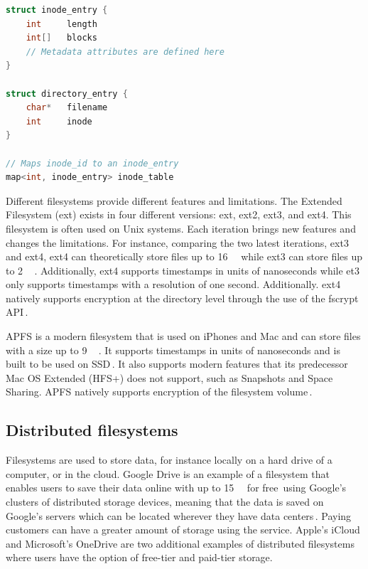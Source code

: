 \begin{minipage}{\linewidth}
\begin{lstlisting}[language=c, caption={Pseudocode of a minimalistic inode filesystem structure}, label=lst:inode_fs]
struct inode_entry {
	int 	length
	int[]	blocks
	// Metadata attributes are defined here
}

struct directory_entry {
	char*   filename
	int     inode
}

// Maps inode_id to an inode_entry
map<int, inode_entry> inode_table

\end{lstlisting}
\end{minipage}

Different filesystems provide different features and limitations. The Extended Filesystem (ext) exists in four different versions: ext, ext2, ext3, and ext4. This filesystem is often used on Unix systems. Each iteration brings new features and changes the limitations. For instance, comparing the two latest iterations, ext3 and ext4, ext4 can theoretically store files up to \SI{16}{\tebi\byte} while ext3 can store files up to \SI{2}{\tebi\byte}\,\cite{salterUnderstandingLinuxFilesystems2018}. Additionally, ext4 supports timestamps in units of nanoseconds while et3 only supports timestamps with a resolution of one second. Additionally. ext4 natively supports encryption at the directory level through the use of the fscrypt \gls{API}\,\cite{FscryptArchWiki}.

\gls{APFS} is a modern filesystem that is used on iPhones and Mac and can store files with a size up to \SI{9}{\exa\byte}\,\cite{igotofferAPFSAppleFile2017}. It supports timestamps in units of nanoseconds and is built to be used on \gls{SSD}\,\cite{nelsonWhatAPFSDoes}. It also supports modern features that its predecessor Mac OS Extended (HFS+) does not support, such as Snapshots and Space Sharing. \gls{APFS} natively supports encryption of the filesystem volume\,\cite{appleinc.FileSystemFormats}.

\subsection{Distributed filesystems}
Filesystems are used to store data, for instance locally on a hard drive of a computer, or in the cloud. Google Drive is an example of a filesystem that enables users to save their data online with up to \SI{15}{\giga\byte} for free\,\cite{CloudStorageWork} using Google's clusters of distributed storage devices, meaning that the data is saved on Google's servers which can be located wherever they have data centers\,\cite{DistributedStorageWhat}. Paying customers can have a greater amount of storage using the service. Apple's iCloud and Microsoft's OneDrive are two additional examples of distributed filesystems where users have the option of \mbox{free-tier} and \mbox{paid-tier} storage.

